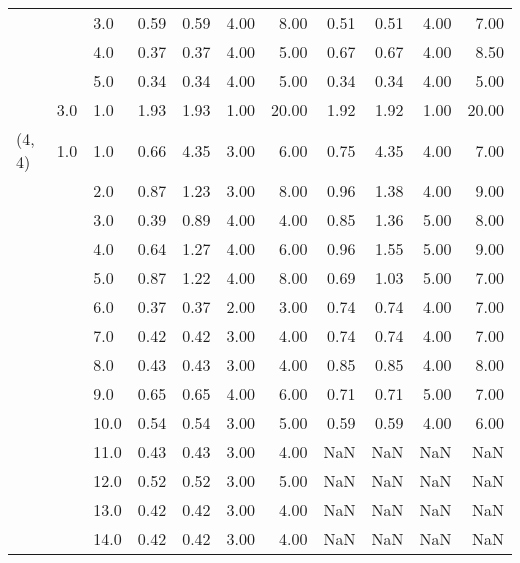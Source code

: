 \begin{tabular}{lllrrrrrrrr}
       &     & 3.0  &       0.59 &      0.59 & 4.00 &   8.00 &       0.51 &      0.51 & 4.00 &   7.00 \\
       &     & 4.0  &       0.37 &      0.37 & 4.00 &   5.00 &       0.67 &      0.67 & 4.00 &   8.50 \\
       &     & 5.0  &       0.34 &      0.34 & 4.00 &   5.00 &       0.34 &      0.34 & 4.00 &   5.00 \\
       & 3.0 & 1.0  &       1.93 &      1.93 & 1.00 &  20.00 &       1.92 &      1.92 & 1.00 &  20.00 \\
(4, 4) & 1.0 & 1.0  &       0.66 &      4.35 & 3.00 &   6.00 &       0.75 &      4.35 & 4.00 &   7.00 \\
       &     & 2.0  &       0.87 &      1.23 & 3.00 &   8.00 &       0.96 &      1.38 & 4.00 &   9.00 \\
       &     & 3.0  &       0.39 &      0.89 & 4.00 &   4.00 &       0.85 &      1.36 & 5.00 &   8.00 \\
       &     & 4.0  &       0.64 &      1.27 & 4.00 &   6.00 &       0.96 &      1.55 & 5.00 &   9.00 \\
       &     & 5.0  &       0.87 &      1.22 & 4.00 &   8.00 &       0.69 &      1.03 & 5.00 &   7.00 \\
       &     & 6.0  &       0.37 &      0.37 & 2.00 &   3.00 &       0.74 &      0.74 & 4.00 &   7.00 \\
       &     & 7.0  &       0.42 &      0.42 & 3.00 &   4.00 &       0.74 &      0.74 & 4.00 &   7.00 \\
       &     & 8.0  &       0.43 &      0.43 & 3.00 &   4.00 &       0.85 &      0.85 & 4.00 &   8.00 \\
       &     & 9.0  &       0.65 &      0.65 & 4.00 &   6.00 &       0.71 &      0.71 & 5.00 &   7.00 \\
       &     & 10.0 &       0.54 &      0.54 & 3.00 &   5.00 &       0.59 &      0.59 & 4.00 &   6.00 \\
       &     & 11.0 &       0.43 &      0.43 & 3.00 &   4.00 &        NaN &       NaN &  NaN &    NaN \\
       &     & 12.0 &       0.52 &      0.52 & 3.00 &   5.00 &        NaN &       NaN &  NaN &    NaN \\
       &     & 13.0 &       0.42 &      0.42 & 3.00 &   4.00 &        NaN &       NaN &  NaN &    NaN \\
       &     & 14.0 &       0.42 &      0.42 & 3.00 &   4.00 &        NaN &       NaN &  NaN &    NaN \\

\end{tabular}
